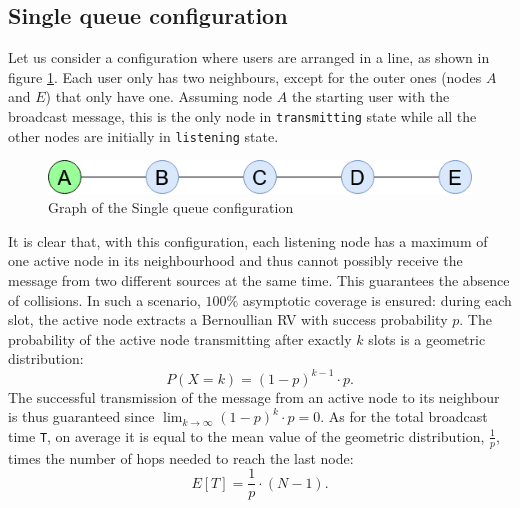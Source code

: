 \subsection{Single queue configuration}\label{ssec:singlequeue}
Let us consider a configuration where users are arranged in a line, as shown in
figure \ref{fig:single_queue_graph}. Each user only has two neighbours, except for
the outer ones (nodes $A$ and $E$) that only have one. Assuming node $A$ the
starting user with the broadcast message, this is the only node in
\texttt{transmitting} state while all the other nodes are initially in
\texttt{listening} state. 
\begin{figure}[H]
    \begin{center}
        \includegraphics[scale=0.6]{img/single_queue.png}
        \caption{Graph of the Single queue configuration}
        \label{fig:single_queue_graph}
    \end{center}
    \vspace*{-0.4cm}
\end{figure}
\noindent It is clear that, with this configuration, each listening node has a
maximum of one active node in its neighbourhood and thus cannot possibly receive
the message from two different sources at the same time. This guarantees the
absence of collisions. In such a scenario, $100\%$ asymptotic coverage is
ensured: during each slot, the active node extracts a Bernoullian RV with
success probability $p$. The probability of the active node transmitting after exactly
$k$ slots is a geometric distribution:
\begin{equation}
	P(X = k) = (1 - p)^{k-1} \cdot p.
	\label{geometricDistribution}
\end{equation}
The successful transmission of the message from an active node to its neighbour
is thus guaranteed since $\lim_{k \to \infty} (1 - p)^{k} \cdot p = 0$.
As for the total broadcast time \texttt{T}, on average it is equal to the mean
value of the geometric distribution, $\frac{1}{p}$, times the number of hops
needed to reach the last node:
\begin{equation}
	E[T] = \frac{1}{p} \cdot (N - 1).
	\label{singleQueueMeanT}
\end{equation}

